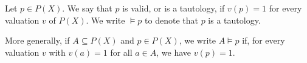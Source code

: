 Let $p \in P(X)$. We say that $p$ is valid, or is a tautology, if $v(p) = 1$ for every valuation $v$ of $P(X)$. We write $\models p$ to denote that $p$ is a tautology.

More generally, if $A \subseteq P(X)$ and $p \in P(X)$, we write $A \models p$ if, for every valuation $v$ with $v(a) = 1$ for all $a \in A$, we have $v(p) = 1$.
